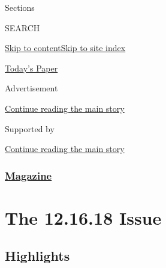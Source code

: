 Sections

SEARCH

\protect\hyperlink{site-content}{Skip to
content}\protect\hyperlink{site-index}{Skip to site index}

\href{https://myaccount.nytimes3xbfgragh.onion/auth/login?response_type=cookie\&client_id=vi}{}

\href{https://www.nytimes3xbfgragh.onion/section/todayspaper}{Today's
Paper}

Advertisement

\protect\hyperlink{after-top}{Continue reading the main story}

Supported by

\protect\hyperlink{after-sponsor}{Continue reading the main story}

\hypertarget{magazine}{%
\subsubsection{\texorpdfstring{\href{/section/magazine}{Magazine}}{Magazine}}\label{magazine}}

\hypertarget{the-121618-issue}{%
\section{The 12.16.18 Issue}\label{the-121618-issue}}

\hypertarget{highlights}{%
\subsection{Highlights}\label{highlights}}

